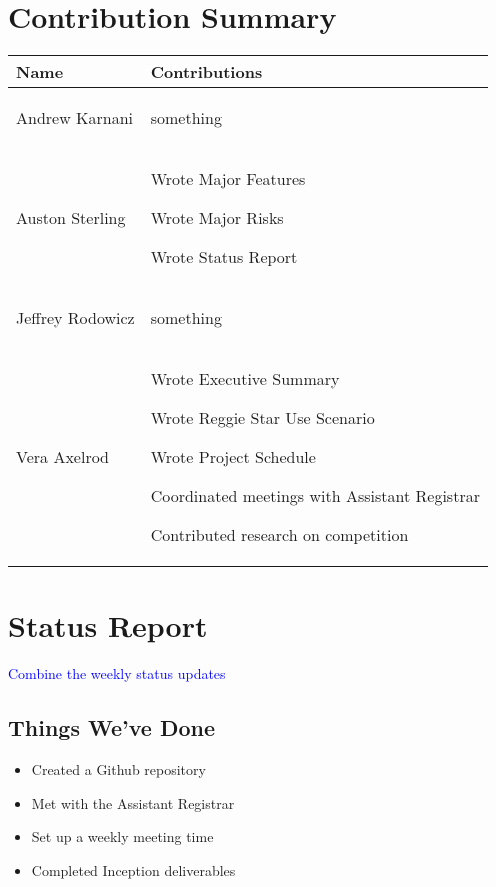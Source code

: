 \documentclass[11pt]{article}
\newenvironment{packed_itemize}{
\begin{itemize}
  \setlength{\itemsep}{1pt}
  \setlength{\parskip}{0pt}
  \setlength{\parsep}{0pt}
}{\end{itemize}}
\begin{document}
\section{Contribution Summary} %
\begin{tabular}{|m{1.4in}|m{4in}|}
\hline
\textbf{\large Name}     & \textbf{\large Contributions} \\
\hline\hline
 Andrew Karnani
	& 
	 \begin{packed_itemize} 
		\item something
	\end{packed_itemize}
\\
\hline
 Auston Sterling
	& 
	 \begin{packed_itemize} 
	        \item Wrote Major Features
                \item Wrote Major Risks
                \item Wrote Status Report
	\end{packed_itemize}
\\
\hline
Jeffrey Rodowicz
	& 
	 \begin{packed_itemize} 
		\item something
	\end{packed_itemize}
\\
\hline
Vera Axelrod
	& 
	 \begin{packed_itemize} 
		\item Wrote Executive Summary 
		\item Wrote Reggie Star Use Scenario
		\item Wrote Project Schedule
		\item Coordinated meetings with Assistant Registrar
		\item Contributed research on competition
	\end{packed_itemize}
\\
\hline
\end{tabular}


\section{Status Report} %
\textcolor{blue}{Combine the weekly status updates}
\subsection{Things We've Done}
\begin{itemize}
\item Created a Github repository
\item Met with the Assistant Registrar
\item Set up a weekly meeting time
\item Completed Inception deliverables
\end{itemize}
\end{document}
